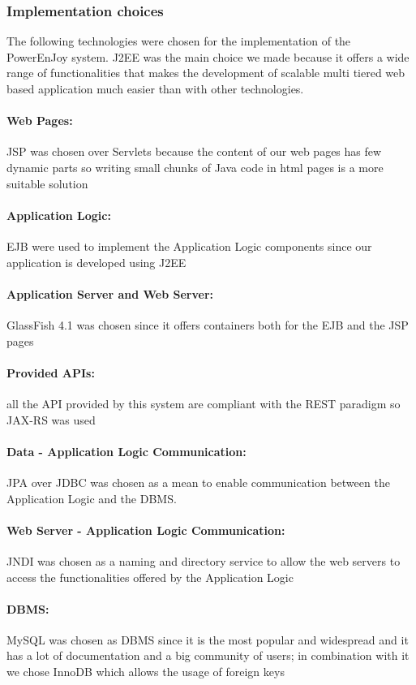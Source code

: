 \subsubsection{Implementation choices}
The following technologies were chosen for the implementation of the PowerEnJoy system. J2EE was the main choice we made because it offers a wide range of functionalities that makes the development of scalable multi tiered web based application much easier than with other technologies.

\paragraph{Web Pages:} JSP was chosen over Servlets because the content of our web pages has few dynamic parts so writing small chunks of Java code in html pages is a more suitable solution
\paragraph{Application Logic:} EJB were used to implement the Application Logic components since our application is developed using J2EE
\paragraph{Application Server and Web Server:} GlassFish 4.1 was chosen since it offers containers both for the EJB and the JSP pages 
\paragraph{Provided APIs:} all the API provided by this system are compliant with the REST paradigm so JAX-RS was used
\paragraph{Data - Application Logic Communication:} JPA over JDBC was chosen as a mean to enable communication between the Application Logic and the DBMS.

\paragraph{Web Server - Application Logic Communication:} JNDI was chosen as a naming and directory service to allow the web servers to access the functionalities offered by the Application Logic
\paragraph{DBMS:} MySQL was chosen as DBMS since it is the most popular and widespread and it has a lot of documentation and a big community of users; in combination with it we chose InnoDB which allows the usage of foreign keys
\clearpage
